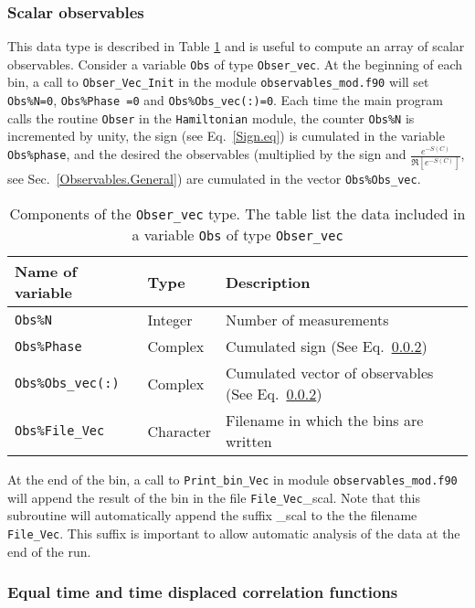 \subsubsection{Scalar observables}
This data type  is described in Table  \ref{table:Obser_vec} and  is useful to compute an array of  scalar observables.   Consider  a variable \texttt{Obs} of type  \texttt{Obser\_vec}.  At the beginning of each bin,  a call to  \texttt{Obser\_Vec\_Init} in the module \texttt{observables\_mod.f90}  will  set   \texttt{Obs\%N=0},   \texttt{Obs\%Phase =0}  and  \texttt{Obs\%Obs\_vec(:)=0}.  Each time the main  program calls the routine \texttt{Obser}  in the  \texttt{Hamiltonian} module,  the counter \texttt{Obs\%N}   is incremented by unity,   the sign  (see Eq.~\ref{Sign.eq}) is cumulated in the  variable \texttt{Obs\%phase},  and the desired  the observables (multiplied by the sign and   $\frac{e^{-S(C)}} {\Re \left[e^{-S(C)} \right]}$, see Sec.~\ref{Observables.General})  are cumulated in the vector \texttt{Obs\%Obs\_vec}.  
\begin{table}[h]
   \begin{tabular}{l ll }
    Name of variable  &  Type      &  Description \\\hline
    \texttt{Obs\%N}                       &  Integer        &   Number of measurements  \\
    \texttt{Obs\%Phase}               &  Complex     &    Cumulated sign (See Eq.~\ref{})  \\
    \texttt{Obs\%Obs\_vec(:)}        & Complex      &    Cumulated vector of observables (See  Eq.~\ref{}) \\
     \texttt{Obs\%File\_Vec}           &  Character    &    Filename  in which the bins are written  
   \end{tabular}
   \caption{Components of the \texttt{Obser\_vec}  type.  The table list the data included in a variable  \texttt{Obs}  of type \texttt{Obser\_vec} 
    \label{table:Obser_vec}}
\end{table}
At the end of the bin, a call to  \texttt{Print\_bin\_Vec}   in  module \texttt{observables\_mod.f90}  will  append the result of the bin in the file  \texttt{File\_Vec}\_scal.  Note that this subroutine will automatically append the suffix  \_scal 
to the the filename \texttt{File\_Vec}.    This suffix  is important to allow automatic analysis of the data at the end of the run. 

\subsubsection{ Equal time and time displaced correlation functions}

